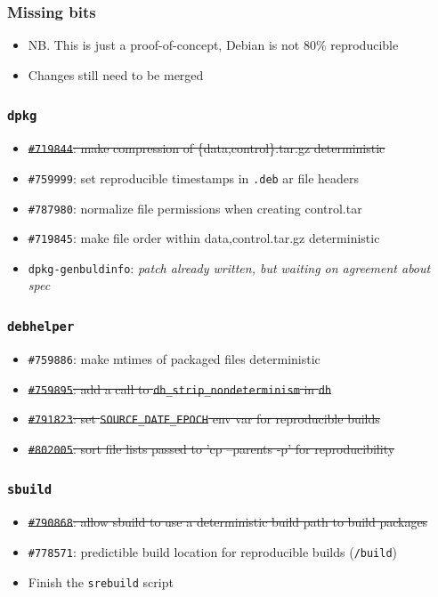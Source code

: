 \documentclass[14pt]{beamer}
\begin{document}
\begin{frame}
 \frametitle{Missing bits}
 \begin{itemize}
  \item NB. This is just a proof-of-concept, Debian is not 80\%
  reproducible
  \item Changes still need to be merged
 \end{itemize}
\end{frame}

\begin{frame}
 \frametitle{\texttt{dpkg}}

 \begin{itemize}
  \item \sout{\texttt{\#719844}: make compression of \{data,control\}.tar.gz deterministic}
  \item \texttt{\#759999}: set reproducible timestamps in \texttt{.deb} ar file headers
  \item \texttt{\#787980}: normalize file permissions when creating control.tar
  \item \texttt{\#719845}: make file order within {data,control}.tar.gz deterministic
  \item \texttt{dpkg-genbuldinfo}: \textit{patch already written, but waiting on agreement about spec}
 \end{itemize}
\end{frame}

\begin{frame}
 \frametitle{\texttt{debhelper}}

 \begin{itemize}
  \item \texttt{\#759886}: make mtimes of packaged files deterministic
  \item \sout{\texttt{\#759895}: add a call to
  \texttt{dh\_strip\_nondeterminism} in \texttt{dh}}
  \item \sout{\texttt{\#791823}: set \texttt{SOURCE\_DATE\_EPOCH} env var for
  reproducible builds}
  \item \sout{\texttt{\#802005}: sort file lists passed to 'cp --parents -p'
  for reproducibility}
 \end{itemize}
\end{frame}

\begin{frame}
 \frametitle{\texttt{sbuild}}

 \begin{itemize}
  \item \sout{\texttt{\#790868}: allow sbuild to use a deterministic build
  path to build packages}
  \item \texttt{\#778571}: predictible build location for reproducible builds
  (\texttt{/build})
  \item Finish the \texttt{srebuild} script
 \end{itemize}
\end{frame}
\end{document}
